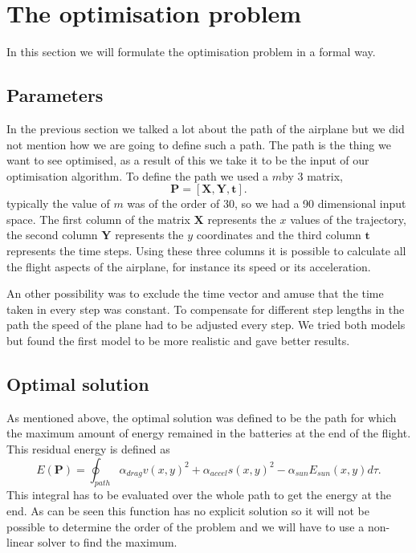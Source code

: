 \section{The optimisation problem}

In this section we will formulate the optimisation problem in a formal way.
\subsection{Parameters}

In the previous section we talked a lot about the path of the airplane but we did not mention how we are going to define such a path.
The path is the thing we want to see optimised, as a result of this we take it to be the input of our optimisation algorithm.
To define the path we used a $ m $by 3 matrix, 
\begin{equation}
\mathbf{P} = \left[\mathbf{X},\mathbf{Y},\mathbf{t} \right] .
\end{equation}
typically the value of $ m $ was of the order of 30, so we had a 90 dimensional input space.
The first column of the matrix $ \mathbf{X} $ represents the $ x $ values of the trajectory, the second column $ \mathbf{Y} $ represents the $ y $ coordinates and the third column $ \mathbf{t}  $ represents the time steps.
Using these three columns it is possible to calculate all the flight aspects of the airplane, for instance its speed or its acceleration.

An other possibility was to exclude the time vector and amuse that the time taken in every step was constant.
To compensate for different step lengths in the path  the  speed of the plane had to be adjusted every step.
We tried both models but found the first model to be more realistic and gave  better results.

\subsection{Optimal solution}

As mentioned above, the optimal solution was defined to be the path for which the maximum amount of energy remained in the batteries at the end of the flight.
This residual  energy is defined as
\begin{equation}
E(\mathbf{P}) = \oint_{path} \alpha_{drag}v(x,y)^2  + \alpha_{accel}  s(x,y)^2   -\alpha_{sun} E_{sun}(x,y)  d\tau.
\end{equation}
This integral has to be evaluated over the whole path to get the energy at the end.
As  can be seen this function has no explicit solution so it will not be possible to determine the order of the problem and we will have to use a non-linear solver to find the maximum.

